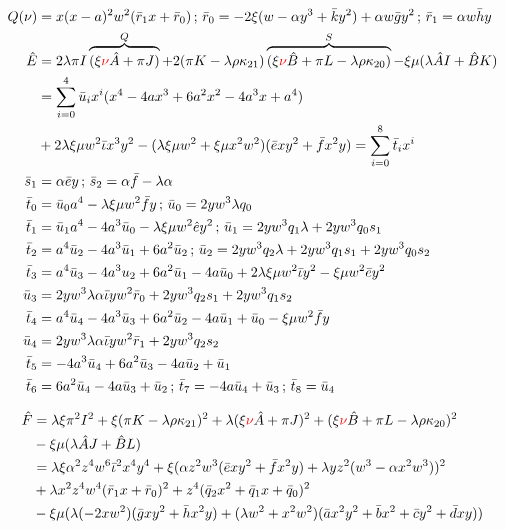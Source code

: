 \documentclass[12pt]{article}
\numberwithin{table}{section}
\begin{document}
\begin{align}
Q(\nu)&=x(x-a)^2 w^2(\bar r_1 x + \bar r_0)\,;\,\bar r_0 = -2\xi (w - \alpha y^3 + \bar k y^2)+\alpha w \bar g y^2 \,;\,\bar r_1 = \alpha w \bar h y\\
\hat E &= 2\lambda \pi I\overbrace{(\xi {\color{red}\nu} \hat A + \pi J)}^{Q} + 2(\pi K - \lambda \rho \kappa_{21})\overbrace{(\xi {\color{red}\nu} \hat B + \pi L - \lambda \rho \kappa_{20})}^{S} - \xi \mu (\lambda \hat AI  + \hat BK  )\nonumber\\
&= \sum_{i=0}^4 \bar u_i x^i (x^4 - 4a x^3 + 6a^2 x^2 - 4 a^3 x + a^4) \nonumber\\
&+ 2\lambda \xi \mu w^2\bar \iota x^3 y^2  - (\lambda \xi \mu w^2 + \xi \mu x^2 w^2)(\bar e xy^2 + \bar f x^2 y) = \sum_{i=0}^8 \bar t_i x^i\\
\bar s_1 &= \alpha \bar e y\,;\,\bar s_2 = \alpha \bar f - \lambda \alpha \\
\bar t_0 &= \bar u_0 a^4 - \lambda \xi \mu w^2 \bar f y\,;\,\bar u_0 = 2yw^3\lambda q_0\\
\bar t_1 &= \bar u_1 a^4 - 4a^3\bar u_0 - \lambda \xi \mu w^2 \hat e y^2\,;\,\bar u_1 = 2yw^3 q_1 \lambda + 2yw^3 q_0 s_1\\
\bar t_2 &= a^4 \bar u_2 - 4a^3 \bar u_1 + 6a^2 \bar u_2\,;\,\bar u_2 = 2yw^3 q_2 \lambda + 2yw^3 q_1 s_1 + 2yw^3 q_0 s_2\\
\bar t_3 &= a^4\bar u_3 - 4a^3 u_2 + 6a^2 \bar u_1 - 4a \bar u_0  + 2\lambda \xi \mu w^2\bar \iota y^2 - \xi \mu w^2 \bar e y^2\\
\bar u_3 &= 2yw^3 \lambda \alpha \bar \iota y w^2 \bar r_0 + 2yw^3 q_2 s_1 + 2yw^3 q_1 s_2\\
\bar t_4 &= a^4 \bar u_4 - 4a^3 \bar u_3 + 6a^2 \bar u_2 -4a \bar u_1 +\bar u_0- \xi \mu w^2 \bar f y\\
\bar u_4 &= 2yw^3 \lambda \alpha \bar \iota y w^2\bar r_1 + 2yw^3q_2 s_2\\
\bar t_5 &= -4a^3\bar u_4 + 6a^2\bar u_3 - 4a\bar u_2 + \bar u_1\\
\bar t_6 &= 6a^2\bar u_4 - 4a\bar u_3 + \bar u_2\,;\,\bar t_7 = -4a\bar u_4 + \bar u_3\,;\,\bar t_8 = \bar u_4
\end{align}

\begin{align}
\hat F &= \lambda\xi \pi^2 I^2 +\xi (\pi K - \lambda \rho \kappa_{21})^2 + \lambda (\xi {\color{red}\nu} \hat A + \pi J)^2 + (\xi {\color{red}\nu} \hat B + \pi L - \lambda \rho \kappa_{20})^2 \nonumber\\
&- \xi \mu (\lambda \hat A J + \hat B L) \\
&= \lambda\xi \alpha^2 z^4w^6 \bar \iota^2 x^4 y^4 +\xi (\alpha z^2w^3 (\bar e xy^2 + \bar f x^2 y) + \lambda yz^2(w^3 - \alpha x^2 w^3) )^2 \\
&+ \lambda x^2z^4 w^4(\bar r_1 x + \bar r_0)^2 + z^4(\bar q_2 x^2 + \bar q_1 x + \bar q_0)^2 \nonumber\\
&- \xi \mu (\lambda (-2xw^2) (\bar g xy^2 + \bar h x^2 y) + (\lambda w^2 + x^2 w^2) (\bar a x^2 y^2 + \bar b x^2 + \bar c y^2 + \bar d xy))
\end{align}
\end{document}
